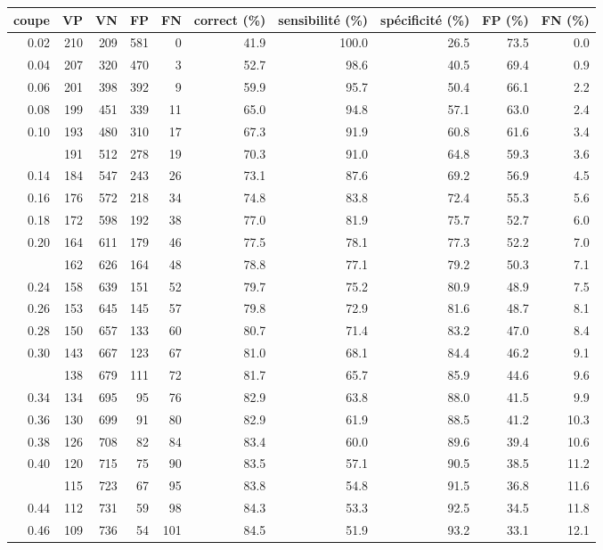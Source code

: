 \documentclass[
  11pt,
  letterpaper,
]{book}
\theoremstyle{definition}
\theoremstyle{definition}
\theoremstyle{definition}
\theoremstyle{definition}
\theoremstyle{remark}
\begin{document}
\begin{longtable}{rrrrrrrrrr}
\toprule
coupe & VP & VN & FP & FN & correct (\%) & sensibilité (\%) & spécificité (\%) & FP (\%) & FN (\%)\\
\midrule
0.02 & 210 & 209 & 581 & 0 & 41.9 & 100.0 & 26.5 & 73.5 & 0.0\\
0.04 & 207 & 320 & 470 & 3 & 52.7 & 98.6 & 40.5 & 69.4 & 0.9\\
0.06 & 201 & 398 & 392 & 9 & 59.9 & 95.7 & 50.4 & 66.1 & 2.2\\
0.08 & 199 & 451 & 339 & 11 & 65.0 & 94.8 & 57.1 & 63.0 & 2.4\\
0.10 & 193 & 480 & 310 & 17 & 67.3 & 91.9 & 60.8 & 61.6 & 3.4\\
\addlinespace
0.12 & 191 & 512 & 278 & 19 & 70.3 & 91.0 & 64.8 & 59.3 & 3.6\\
0.14 & 184 & 547 & 243 & 26 & 73.1 & 87.6 & 69.2 & 56.9 & 4.5\\
0.16 & 176 & 572 & 218 & 34 & 74.8 & 83.8 & 72.4 & 55.3 & 5.6\\
0.18 & 172 & 598 & 192 & 38 & 77.0 & 81.9 & 75.7 & 52.7 & 6.0\\
0.20 & 164 & 611 & 179 & 46 & 77.5 & 78.1 & 77.3 & 52.2 & 7.0\\
\addlinespace
0.22 & 162 & 626 & 164 & 48 & 78.8 & 77.1 & 79.2 & 50.3 & 7.1\\
0.24 & 158 & 639 & 151 & 52 & 79.7 & 75.2 & 80.9 & 48.9 & 7.5\\
0.26 & 153 & 645 & 145 & 57 & 79.8 & 72.9 & 81.6 & 48.7 & 8.1\\
0.28 & 150 & 657 & 133 & 60 & 80.7 & 71.4 & 83.2 & 47.0 & 8.4\\
0.30 & 143 & 667 & 123 & 67 & 81.0 & 68.1 & 84.4 & 46.2 & 9.1\\
\addlinespace
0.32 & 138 & 679 & 111 & 72 & 81.7 & 65.7 & 85.9 & 44.6 & 9.6\\
0.34 & 134 & 695 & 95 & 76 & 82.9 & 63.8 & 88.0 & 41.5 & 9.9\\
0.36 & 130 & 699 & 91 & 80 & 82.9 & 61.9 & 88.5 & 41.2 & 10.3\\
0.38 & 126 & 708 & 82 & 84 & 83.4 & 60.0 & 89.6 & 39.4 & 10.6\\
0.40 & 120 & 715 & 75 & 90 & 83.5 & 57.1 & 90.5 & 38.5 & 11.2\\
\addlinespace
0.42 & 115 & 723 & 67 & 95 & 83.8 & 54.8 & 91.5 & 36.8 & 11.6\\
0.44 & 112 & 731 & 59 & 98 & 84.3 & 53.3 & 92.5 & 34.5 & 11.8\\
0.46 & 109 & 736 & 54 & 101 & 84.5 & 51.9 & 93.2 & 33.1 & 12.1\\

\end{longtable}
\end{document}
